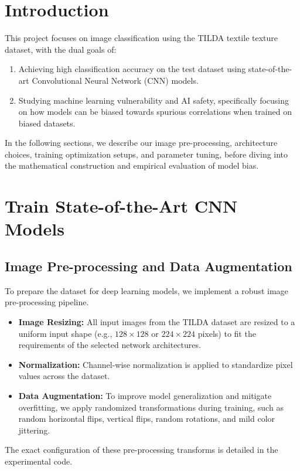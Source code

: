 \documentclass{name}
\begin{document}
\section{Introduction}
This project focuses on image classification using the TILDA textile texture dataset, with the dual goals of:
\begin{enumerate}
    \item Achieving high classification accuracy on the test dataset using state-of-the-art Convolutional Neural Network (CNN) models.
    \item Studying machine learning vulnerability and AI safety, specifically focusing on how models can be biased towards spurious correlations when trained on biased datasets.
\end{enumerate}
In the following sections, we describe our image pre-processing, architecture choices, training optimization setups, and parameter tuning, before diving into the mathematical construction and empirical evaluation of model bias.

\section{Train State-of-the-Art CNN Models}

\subsection{Image Pre-processing and Data Augmentation}
To prepare the dataset for deep learning models, we implement a robust image pre-processing pipeline. 
\begin{itemize}
    \item \textbf{Image Resizing:} All input images from the TILDA dataset are resized to a uniform input shape (e.g., $128 \times 128$ or $224 \times 224$ pixels) to fit the requirements of the selected network architectures.
    \item \textbf{Normalization:} Channel-wise normalization is applied to standardize pixel values across the dataset.
    \item \textbf{Data Augmentation:} To improve model generalization and mitigate overfitting, we apply randomized transformations during training, such as random horizontal flips, vertical flips, random rotations, and mild color jittering.
\end{itemize}
The exact configuration of these pre-processing transforms is detailed in the experimental code.
\end{document}
